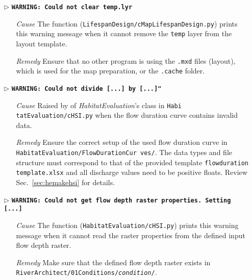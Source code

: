 \begin{itemize}
	\item[$\triangleright$]\textbf{\texttt{WARNING: Could not clear temp.lyr}}
	\begin{itemize}
		\item[\textit{Cause}\hspace{0.27cm}] The function  (\texttt{LifespanDesign/cMapLifespanDesign.py}) prints this warning message when it cannot remove the \texttt{temp} layer from the layout template.
		\item[\textit{Remedy}] Ensure that no other program is using the \texttt{.mxd} files (layout), which is used for the map preparation, or the \texttt{.cache} folder.\\
	\end{itemize}
		
	\item[$\triangleright$]\textbf{\texttt{WARNING: Could not divide [...] by [...]"}}
	\begin{itemize}
		\item[\textit{Cause}\hspace{0.27cm}] Raised by  of \textit{HabitatEvaluation}'s  class in \texttt{Habi tatEvaluation/cHSI.py} when the flow duration curve contains invalid data.
		\item[\textit{Remedy}] Ensure the correct setup of the used flow duration curve in \texttt{HabitatEvaluation/FlowDurationCur ves/}. The data types and file structure must correspond to that of the provided template \texttt{flow{\myUnderscore}duration {\myUnderscore}template.xlsx} and all discharge values need to be positive floats. Review Sec.~\ref{sec:hemakehsi} for details.\\
	\end{itemize}
	
	\item[$\triangleright$]\textbf{\texttt{WARNING: Could not get flow depth raster properties. Setting [...]}}
	\begin{itemize}
		\item[\textit{Cause}\hspace{0.27cm}] The  function (\texttt{HabitatEvaluation/cHSI.py}) prints this warning message when it cannot read the raster properties from the defined input flow depth raster.
		\item[\textit{Remedy}] Make sure that the defined flow depth raster exists in \texttt{RiverArchitect/01{\myUnderscore}Conditions/\textit{condition}/}.\\
	\end{itemize}
	

\end{itemize}
